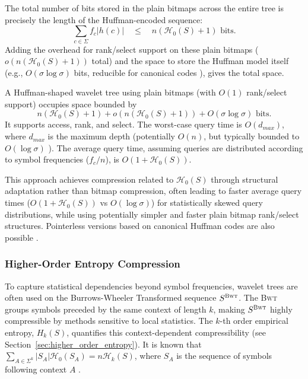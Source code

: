 The total number of bits stored in the plain bitmaps across the entire tree is precisely the length of the Huffman-encoded sequence:
\[ \sum_{c \in \Sigma} f_c |h(c)| \quad \le \quad n(\mathcal{H}_0(S)+1) \text{ bits}. \]
Adding the overhead for rank/select support on these plain bitmaps ($o(n(\mathcal{H}_0(S)+1))$ total) and the space to store the Huffman model itself (e.g., $O(\sigma \log \sigma)$ bits, reducible for canonical codes \cite{claude2015wavelet}), gives the total space.

\begin{theorem} \label{thm:huffman_wt_space_time}
    A Huffman-shaped wavelet tree using plain bitmaps (with $O(1)$ rank/select support) occupies space bounded by
    \[ n(\mathcal{H}_0(S)+1) + o(n(\mathcal{H}_0(S)+1)) + O(\sigma \log \sigma) \text{ bits}. \]
    It supports \textsf{access}, \textsf{rank}, and \textsf{select}. The worst-case query time is $O(d_{max})$, where $d_{max}$ is the maximum depth (potentially $O(n)$, but typically bounded to $O(\log \sigma)$ \cite{navarro2007compressed}). The average query time, assuming queries are distributed according to symbol frequencies ($f_c/n$), is $O(1+\mathcal{H}_0(S))$.
\end{theorem}

This approach achieves compression related to $\mathcal{H}_0(S)$ through structural adaptation rather than bitmap compression, often leading to faster average query times ($O(1+\mathcal{H}_0(S))$ vs $O(\log \sigma)$) for statistically skewed query distributions, while using potentially simpler and faster plain bitmap rank/select structures. Pointerless versions based on canonical Huffman codes are also possible \cite{claude2015wavelet}.

\subsubsection{Higher-Order Entropy Compression} \label{subsec:higher_order_entropy}

To capture statistical dependencies beyond symbol frequencies, wavelet trees are often used on the Burrows-Wheeler Transformed \cite{burrows1994block} sequence $S^{\textsc{Bwt}}$. The \textsc{Bwt} groups symbols preceded by the same context of length $k$, making $S^{\textsc{Bwt}}$ highly compressible by methods sensitive to local statistics. The $k$-th order empirical entropy, $H_k(S)$, quantifies this context-dependent compressibility (see Section~\ref{sec:higher_order_entropy}). It is known that $\sum_{A \in \Sigma^k} |S_A| \mathcal{H}_0(S_A) = n \mathcal{H}_k(S)$, where $S_A$ is the sequence of symbols following context $A$ \cite{manzini2001analysis}.

